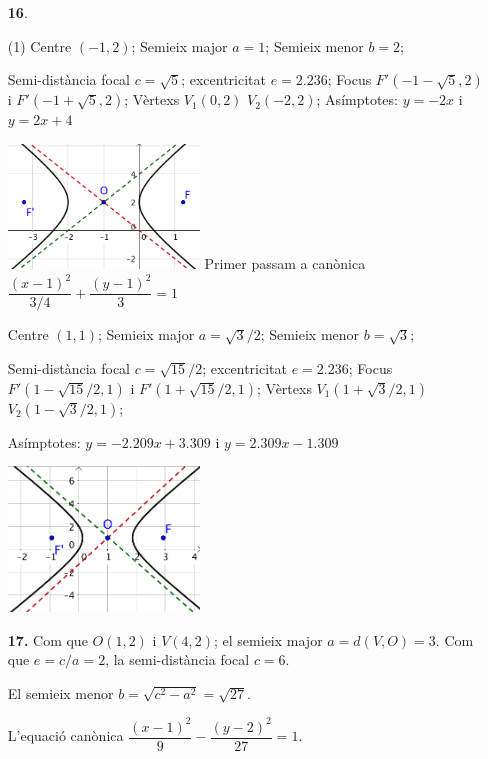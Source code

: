 \documentclass[a4paper, pdf, twoside]{book}
\begin{document}
\begin{multicols}{2}
\begin{enumerate}

 \item[\fontfamily{phv}\selectfont\color{blue}\textbf{16}. ] 
 \begin{tasks}[column-sep=1em, item-indent=1.3333em](1)
	 \task* Centre $(-1,2)$; Semieix major $a=1$; Semieix menor $b=2$;\par Semi-distància focal $c=\sqrt {5}$; excentricitat $e=2.236$; Focus $F'(-1-\sqrt {5},2)$ i $F'(-1+\sqrt {5},2)$; Vèrtexs $V_1(0,2)$ \; $V_2(-2,2)$; Asímptotes: $y=-2x$ i $y=2x+4$ \par \includegraphics [width=0.4\textwidth ]{img-sol/t10-14a}
	 \task* Primer passam a canònica $\dfrac {(x-1)^2}{3/4}+\dfrac {(y-1)^2}{3}=1$\par Centre $(1,1)$; Semieix major $a=\sqrt {3}/2$; Semieix menor $b=\sqrt {3}$;\par Semi-distància focal $c=\sqrt {15}/2$; excentricitat $e=2.236$; Focus $F'(1-\sqrt {15}/2,1)$ i $F'(1+\sqrt {15}/2,1)$; Vèrtexs $V_1(1+\sqrt {3}/2,1)$ \; $V_2(1-\sqrt {3}/2,1)$;\par Asímptotes: $y=-2.209x+3.309$ i $y=2.309x-1.309$ \par \includegraphics [width=0.4\textwidth ]{img-sol/t10-14b}
\end{tasks}
\vspace{0.25cm}
\item[\fontfamily{phv}\selectfont\color{blue}\textbf{17. }] 
Com que $O(1,2)$ i $V(4,2)$; el semieix major $a=d(V,O)=3$. Com que $e=c/a=2$, la semi-distància focal $c=6$.\par El semieix menor $b=\sqrt {c^2-a^2}=\sqrt {27}$.\par L'equació canònica $\dfrac {(x-1)^2}{9}-\dfrac {(y-2)^2}{27}=1$.

\end{enumerate}
\end{multicols}
\end{document}
